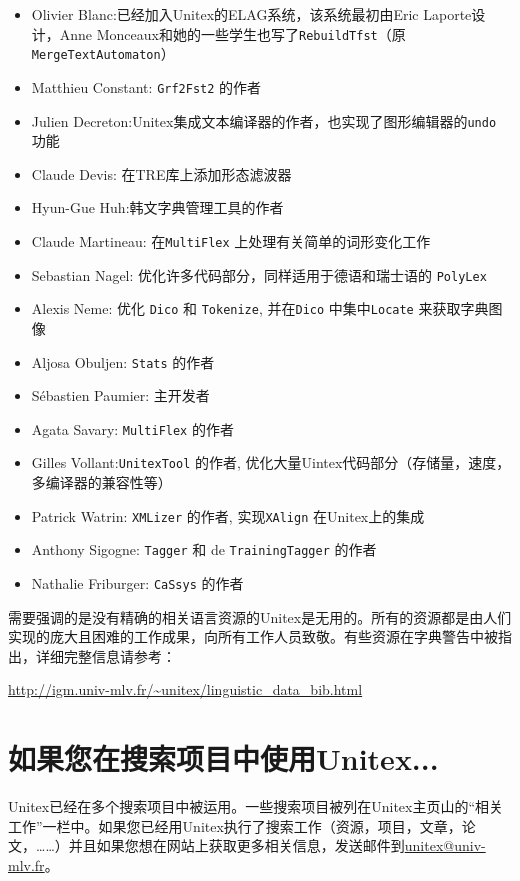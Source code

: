 
\begin{itemize}                   
    \item Olivier Blanc:已经加入Unitex的ELAG系统，该系统最初由Eric Laporte设计，Anne Monceaux和她的一些学生也写了\verb+RebuildTfst+（原\verb+MergeTextAutomaton+）
    

    \item Matthieu Constant: \verb+Grf2Fst2+ 的作者
    \item Julien Decreton:Unitex集成文本编译器的作者，也实现了图形编辑器的\verb+undo+ 功能
    \item Claude Devis: 在TRE库上添加形态滤波器
    \item Hyun-Gue Huh:韩文字典管理工具的作者
    \item Claude Martineau: 在\verb+MultiFlex+
    上处理有关简单的词形变化工作
    \item Sebastian Nagel: 优化许多代码部分，同样适用于德语和瑞士语的 \verb+PolyLex+
    \item Alexis Neme: 优化 \verb+Dico+ 和 \verb+Tokenize+, 
    并在\verb+Dico+ 中集中\verb+Locate+ 来获取字典图像

     \item Aljosa Obuljen: \verb+Stats+ 的作者
     \item Sébastien Paumier: 主开发者
     \item Agata Savary: \verb+MultiFlex+ 的作者
    \item Gilles Vollant:\verb+UnitexTool+ 的作者, 优化大量Uintex代码部分（存储量，速度，多编译器的兼容性等）
    \item Patrick Watrin: \verb+XMLizer+ 的作者, 实现\verb+XAlign+ 在Unitex上的集成
    \item Anthony Sigogne: \verb+Tagger+ 和 de \verb+TrainingTagger+ 的作者
    \item Nathalie Friburger: \verb+CaSsys+ 的作者
\end{itemize}

\bigskip
\noindent
需要强调的是没有精确的相关语言资源的Unitex是无用的。所有的资源都是由人们实现的庞大且困难的工作成果，向所有工作人员致敬。有些资源在字典警告中被指出，详细完整信息请参考：

\noindent \url{http://igm.univ-mlv.fr/~unitex/linguistic_data_bib.html}


\section*{如果您在搜索项目中使用Unitex...}
Unitex已经在多个搜索项目中被运用。一些搜索项目被列在Unitex主页山的“相关工作”一栏中。如果您已经用Unitex执行了搜索工作（资源，项目，文章，论文，……）并且如果您想在网站上获取更多相关信息，发送邮件到\url{unitex@univ-mlv.fr}。


